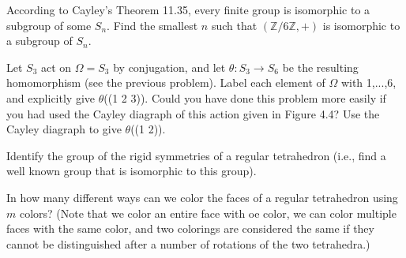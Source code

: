 \documentclass[12pt,letterpaper,boxed]{hmcpset}
\begin{document}

\begin{problem}[11.4.2]
According to Cayley's Theorem 11.35, every finite group is isomorphic to a subgroup of some $S_n$. Find the smallest $n$ such that $(\mathbb{Z}/6\mathbb{Z},+)$ is isomorphic to a subgroup of $S_n$. 
\end{problem}

\begin{solution}
\end{solution}

\clearpage

\begin{problem}[11.4.5]
Let $S_3$ act on $\Omega = S_3$ by conjugation, and let $\theta: S_3 \rightarrow S_6$ be the resulting homomorphism (see the previous problem). Label each element of $\Omega$ with 1,...,6, and explicitly give $\theta$((1 2 3)). Could you have done this problem more easily if you had used the Cayley diagraph of this action given in Figure 4.4? Use the Cayley diagraph to give $\theta$((1 2)).
\end{problem}

\begin{solution}
\end{solution}

\clearpage

\begin{problem}[11.4.8]
Identify the group of the rigid symmetries of a regular tetrahedron (i.e., find a well known group that is isomorphic to this group).
\end{problem}

\begin{solution}
\end{solution}

\clearpage

\begin{problem}[11.4.9]
In how many different ways can we color the faces of a regular tetrahedron using $m$ colors? (Note that we color an entire face with oe color, we can color multiple faces with the same color, and two colorings are considered the same if they cannot be distinguished after a number of rotations of the two tetrahedra.)
\end{problem}

\begin{solution}
\end{solution}

\clearpage
\end{document}
